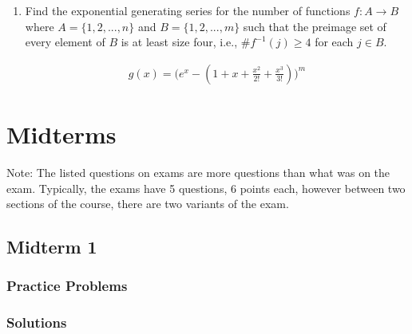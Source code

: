 \documentclass{report}
\begin{document}
{\begin{enumerate}
          Similarly, let $B$ be the set of the chosen $r$ elements and the ways they can be placed into $n$ different boxes. This is clearly represented by the generating series

          \begin{align*}
              g_2(x) = \frac{1}{(1-x)}
          \end{align*}

          Clearly, $S = A \star B$ which is the star product and thus, we can clearly see that the number of ways to choose a subset of $r$ and distribute $r$ elements into $n$ boxes is counted by $S$ which has a generating series:

          \begin{align*}
              g(x) = \frac{e^x}{(1-x)^n}
          \end{align*}

    \item Find the exponential generating series for the number of functions $f:A\to B$ where $A=\{1,2,...,n\}$ and $B=\{1,2,...,m\}$ such that the preimage set of every element of $B$ is at least size four, i.e., $\#f^{-1}(j)\geq 4$ for each $j\in B$.

          \begin{align*}
              g(x) = \Big ( e^x - (1 + x + \frac{x^2}{2!} + \frac{x^3}{3!}) \Big )^m
          \end{align*}
\end{enumerate}

\chapter{Midterms}

Note: The listed questions on exams are more questions than what was
on the exam. Typically, the exams have 5 questions, 6 points each, however
between two sections of the course, there are two variants of the exam.

\section{Midterm 1}

\subsection{Practice Problems}

\subsection{Solutions}

}
\end{document}
